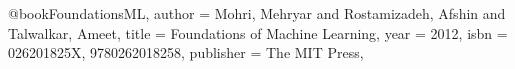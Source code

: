 @book{FoundationsML,
 author = {Mohri, Mehryar and Rostamizadeh, Afshin and Talwalkar, Ameet},
 title = {Foundations of Machine Learning},
 year = {2012},
 isbn = {026201825X, 9780262018258},
 publisher = {The MIT Press},
} 